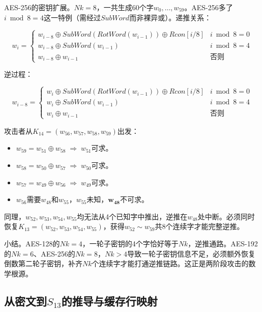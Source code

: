 AES-256的密钥扩展。$Nk = 8$，一共生成60个字$w_0, \dots, w_{59}$。AES-256多了$i \bmod 8 = 4$这一特例（需经过$SubWord$而非裸异或）。递推关系：

\begin{equation}
w_i = \begin{cases} w_{i-8} \oplus SubWord(RotWord(w_{i-1})) \oplus Rcon[i/8] & i \bmod 8 = 0 \\ w_{i-8} \oplus SubWord(w_{i-1}) & i \bmod 8 = 4 \\ w_{i-8} \oplus w_{i-1} & \text{否则} \end{cases}
\end{equation}

逆过程：

\begin{equation}
w_{i-8} = \begin{cases} w_i \oplus SubWord(RotWord(w_{i-1})) \oplus Rcon[i/8] & i \bmod 8 = 0 \\ w_i \oplus SubWord(w_{i-1}) & i \bmod 8 = 4 \\ w_i \oplus w_{i-1} & \text{否则} \end{cases}
\end{equation}

攻击者从$K_{14} = (w_{56}, w_{57}, w_{58}, w_{59})$出发：
\begin{itemize}
    \item $w_{59} = w_{51} \oplus w_{58} \;\Rightarrow\; w_{51}$可求。
    \item $w_{58} = w_{50} \oplus w_{57} \;\Rightarrow\; w_{50}$可求。
    \item $w_{57} = w_{49} \oplus w_{56} \;\Rightarrow\; w_{49}$可求。
    \item $w_{56}$需要$w_{48}$和$w_{55}$，$w_{55}$未知，$\mathbf{w_{48}}$不可求。
\end{itemize}
同理，$w_{52}, w_{53}, w_{54}, w_{55}$均无法从4个已知字中推出，逆推在$w_{48}$处中断。必须同时恢复$K_{13} = (w_{52}, w_{53}, w_{54}, w_{55})$，获得$w_{52} \sim w_{59}$共8个连续字才能完整逆推。

小结。AES-128的$Nk = 4$，一轮子密钥的4个字恰好等于$Nk$，逆推通路。AES-192的$Nk = 6$、AES-256的$Nk = 8$，$Nk > 4$导致一轮子密钥信息不足，必须额外恢复倒数第二轮子密钥，补齐$Nk$个连续字才能打通逆推链路。这正是两阶段攻击的数学根源。

\subsection{从密文到$S_{13}$的推导与缓存行映射}

